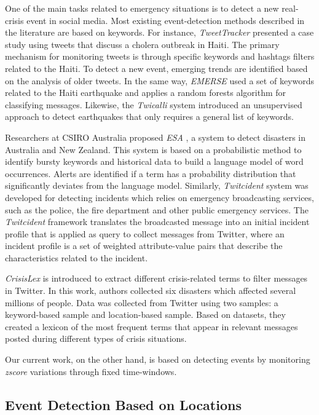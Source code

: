 \documentclass[sigconf]{acmart}
\begin{document}
One of the main tasks related to emergency situations is to detect a new real-crisis event in social media. Most existing event-detection methods described in the literature are based on keywords. For instance, \textit{TweetTracker} \cite{kumar2011tweettracker} presented a case study using tweets that discuss a cholera outbreak in Haiti. The primary mechanism for monitoring tweets is through specific keywords and hashtags filters related to the Haiti. To detect a new event, emerging trends are identified based on the analysis of older tweets. In the same way, \textit{EMERSE} \cite{caragea2011classifying} used a set of keywords related to the Haiti earthquake and applies a random forests algorithm for classifying messages. Likewise, the \textit{Twicalli} system \cite{maldonado2017} introduced an unsupervised approach to detect earthquakes that only requires a general list of keywords. 

Researchers at CSIRO Australia proposed \textit{ESA} \cite{cameron2012emergency,yin2012esa}, a system to detect disasters in Australia and New Zealand. This system is based on a probabilistic method to identify bursty keywords and historical data to build a language model of word occurrences. Alerts are identified if a term has a probability distribution that significantly deviates from the language model. Similarly, \textit{Twitcident} \cite{abel2012twitcident} system was developed for detecting incidents which relies on emergency broadcasting services, such as the police, the fire department and other public emergency services. The \textit{Twitcident} framework translates the broadcasted message into an initial incident profile that is applied as query to collect messages from Twitter, where an incident profile is a set of weighted attribute-value pairs that describe the characteristics related to the incident. 

\textit{CrisisLex} \cite{olteanu2014} is introduced to extract different crisis-related terms to filter messages in Twitter. In this work,
authors collected six disasters which affected several millions of people. Data was collected from Twitter using two samples: a keyword-based sample and location-based sample. Based on datasets, they created a lexicon of the most frequent terms that appear in relevant messages posted during different types of crisis situations.

Our current work, on the other hand, is based on detecting events by monitoring \textit{zscore} variations through fixed time-windows.

\subsection{Event Detection Based on Locations}
\end{document}
